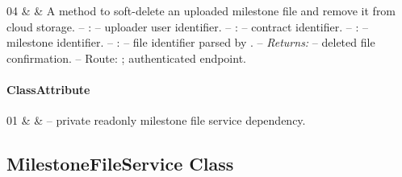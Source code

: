 \begin{ClassMethodTable}
04 & \newline{}\newline{} &
A method to soft-delete an uploaded milestone file and remove it from cloud storage.
\newline -- :  -- uploader user identifier.
\newline -- :  -- contract identifier.
\newline -- :  -- milestone identifier.
\newline -- :  -- file identifier parsed by .
\newline -- \textit{Returns:}  -- deleted file confirmation.
\newline -- Route: ; authenticated endpoint. \\ \hline
\end{ClassMethodTable}

\paragraph{ClassAttribute}
\begin{ClassAttributeTable}
01 &  &  -- private readonly milestone file service dependency. \\ \hline
\end{ClassAttributeTable}

\subsection{MilestoneFileService Class}


